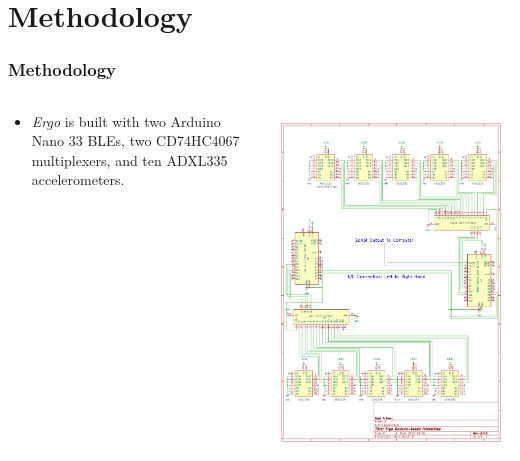 \documentclass[xcolor={svgnames,table},10pt,fleqn]{beamer}
\begin{document}
\section{Methodology}
\begin{frame}
    \frametitle{Methodology}
    \begin{columns}[T] %
    \begin{column}{0.5\textwidth}
        \begin{itemize}
            \item \emph{Ergo} is built with two Arduino Nano 33 BLEs, two
                CD74HC4067 multiplexers, and ten ADXL335 accelerometers.
        \end{itemize}
    \end{column}
    \begin{column}{0.5\textwidth}
        \includegraphics[width=\textwidth]{ergo_schematic.pdf}
    \end{column}
    \end{columns}
\end{frame}
\end{document}
